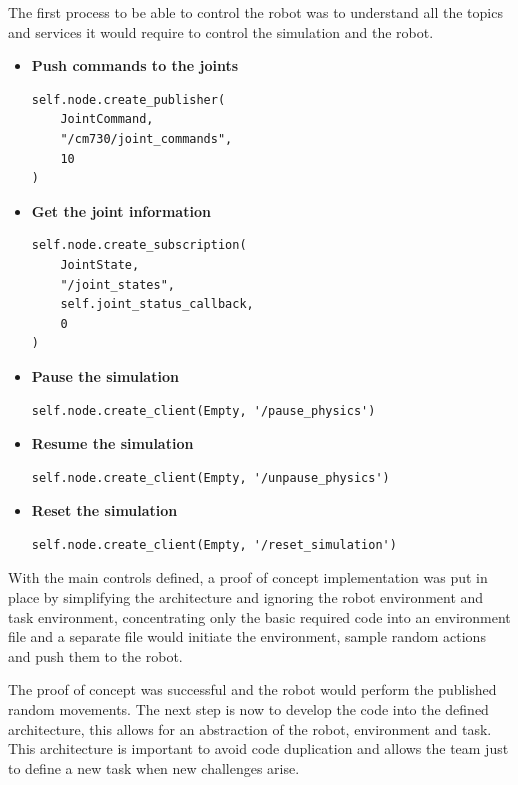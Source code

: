 The first process to be able to control the robot was to understand all the topics and services it would require to control the simulation and the robot.

\begin{itemize}
    \item \textbf{Push commands to the joints}
\begin{lstlisting}
self.node.create_publisher(
    JointCommand, 
    "/cm730/joint_commands", 
    10
)
\end{lstlisting}
    \item \textbf{Get the joint information}
\begin{lstlisting}
self.node.create_subscription(
    JointState, 
    "/joint_states", 
    self.joint_status_callback, 
    0
)
\end{lstlisting}
    \item \textbf{Pause the simulation}
\begin{lstlisting}
self.node.create_client(Empty, '/pause_physics')
\end{lstlisting}
    \item \textbf{Resume the simulation}
\begin{lstlisting}
self.node.create_client(Empty, '/unpause_physics')
\end{lstlisting}
    \item \textbf{Reset the simulation}
\begin{lstlisting}
self.node.create_client(Empty, '/reset_simulation')
\end{lstlisting}
\end{itemize}

With the main controls defined, a proof of concept implementation was put in place by simplifying the architecture and ignoring the robot environment and task environment, concentrating only the basic required code into an environment file and a separate file would initiate the environment, sample random actions and push them to the robot.

The proof of concept was successful and the robot would perform the published random movements. The next step is now to develop the code into the defined architecture, this allows for an abstraction of the robot, environment and task. This architecture is important to avoid code duplication and allows the team just to define a new task when new challenges arise.

